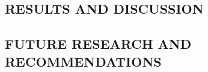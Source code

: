 \begin{center}
	\chapter{RESULTS AND DISCUSSION}
\end{center}
\section{FUTURE RESEARCH AND RECOMMENDATIONS}